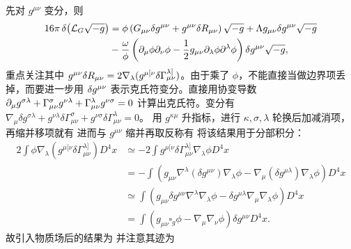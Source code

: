 先对 $g^{\mu\nu}$ 变分，则
\begin{align*}
    16\pi \var(\mathcal L_G\sqrt{-g})&=\phi\left( G_{\mu\nu} \var g^{\mu\nu}+g^{\mu\nu}\var R_{\mu\nu}\right) \sqrt{-g}+ \Lambda g_{\mu\nu} \var g^{\mu\nu}\sqrt{-g}\\
&-\frac{\omega}{\phi}\left(\partial_\mu\phi \partial_\nu\phi-\frac 12 g_{\mu\nu}\partial_\lambda \phi \partial^\lambda\phi\right)\var g^{\mu\nu}\sqrt{-g},
\end{align*}
重点关注其中 $g^{\mu\nu}\var R_{\mu\nu}=2\nabla_\lambda(g^{\mu [\nu} \delta \Gamma_{\mu \nu}^{\lambda]})$。由于乘了 $\phi$，不能直接当做边界项丢掉，而要进一步用 $\var g^{\mu\nu}$ 表示克氏符变分。直接用协变导数 $\partial_\mu g^{\sigma\lambda}+\Gamma^\sigma_{\mu\nu} g^{\nu\lambda}+\Gamma^\lambda_{\mu\nu} g^{\nu\sigma}=0$ 计算出克氏符。变分有 $\nabla_\mu \delta g^{\sigma\lambda}+g^{\nu\lambda}\delta \Gamma^\sigma_{\mu\nu} +g^{\nu\sigma}\delta \Gamma^\lambda_{\mu\nu} =0$。
用 $g^{\kappa\mu}$ 升指标，进行 $\kappa,\sigma,\lambda$ 轮换后加减消项，再缩并移项就有
进而与 $g^{\mu\nu}$ 缩并再取反称有
将该结果用于分部积分：
\begin{align*}
    2\int \phi \nabla_\lambda(g^{\mu [\nu} \delta \Gamma_{\mu \nu}^{\lambda]}) D^4x &\simeq -2\int  g^{\mu [\nu} \delta \Gamma_{\mu \nu}^{\lambda]} \nabla_\lambda \phi D^4x\\
    &= -\int  (g_{\mu\nu}\nabla^\lambda (\delta g^{\mu\nu})\nabla_\lambda \phi - \nabla_\mu(\delta g^{\mu\lambda}) \nabla_\lambda \phi)  D^4x\\
    &\simeq \int  (g_{\mu\nu} \delta g^{\mu\nu}\nabla^\lambda \nabla_\lambda \phi - \delta g^{\mu\lambda} \nabla_\mu\nabla_\lambda \phi)  D^4x\\
    &=\int  (g_{\mu\nu} \square_g \phi - \nabla_\mu\nabla_\nu \phi) \delta g^{\mu\nu} D^4x.
\end{align*}
故引入物质场后的结果为 %
并注意其迹为


